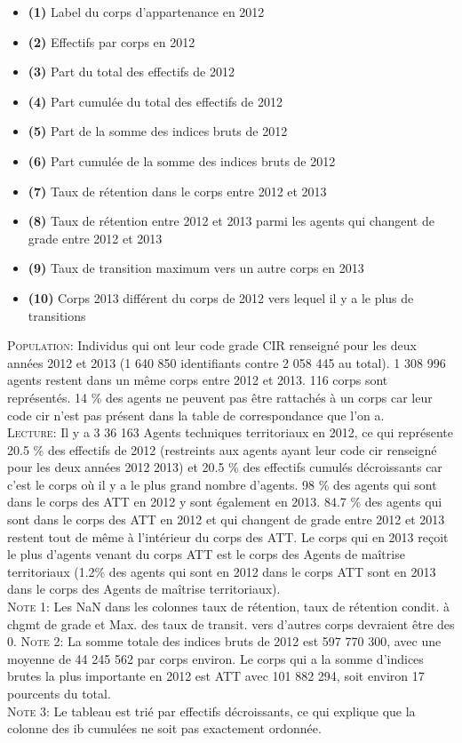 \documentclass[10pt]{article}
\begin{document}
\begin{landscape}
\begin{itemize}
	\item \textbf{(1)} Label du corps d'appartenance en 2012
	\item \textbf{(2)} Effectifs par corps en 2012
	\item \textbf{(3)} Part du total des effectifs de 2012
	\item \textbf{(4)} Part cumulée du total des effectifs de 2012
	\item \textbf{(5)} Part de la somme des indices bruts de 2012
	\item \textbf{(6)} Part cumulée de la somme des indices bruts de 2012
	\item \textbf{(7)} Taux de rétention dans le corps entre 2012 et 2013
	\item \textbf{(8)} Taux de rétention entre 2012 et 2013 parmi les agents qui changent de grade entre 2012 et 2013 
	\item \textbf{(9)} Taux de transition maximum vers un autre corps en 2013
	\item \textbf{(10)} Corps 2013 différent du corps de 2012 vers lequel il y a le plus de transitions
\end{itemize}
\indent \indent \textsc{Population:} Individus qui ont leur code grade CIR renseigné pour les deux années 2012 et 2013 (1 640 850 identifiants contre 2 058 445 au total). 1 308 996 agents restent dans un même corps entre 2012 et 2013. 116 corps sont représentés. 14 \% des agents ne peuvent pas être rattachés à un corps car leur code cir n'est pas présent dans la table de correspondance que l'on a.\\
\indent \textsc{Lecture:} Il y a 3 36 163 Agents techniques territoriaux en 2012, ce qui représente 20.5 \% des effectifs de 2012 (restreints aux agents ayant leur code cir renseigné pour les deux années 2012 2013) et 20.5 \% des effectifs cumulés décroissants car c'est le corps où il y a le plus grand nombre d'agents. 98 \% des agents qui sont dans le corps des ATT en 2012 y sont également en 2013. 84.7 \% des agents qui sont dans le corps des ATT en 2012 et qui changent de grade entre 2012 et 2013 restent tout de même à l'intérieur du corps des ATT. Le corps qui en 2013 reçoit le plus d'agents venant du corps ATT est le corps des Agents de maîtrise territoriaux (1.2\% des agents qui sont en 2012 dans le corps ATT sont en 2013 dans le corps des Agents de maîtrise territoriaux).\\
\indent \textsc{Note 1:} Les NaN dans les colonnes taux de rétention, taux de rétention condit. à chgmt de grade et Max. des taux de transit. vers d'autres corps devraient être des 0.
\indent \textsc{Note 2:} La somme totale des indices bruts de 2012 est 597 770 300, avec une moyenne de 44 245 562 par corps environ. Le corps qui a la somme d'indices brutes la plus importante en 2012 est ATT avec 101 882 294, soit environ 17 pourcents du total.\\
\indent \textsc{Note 3:} Le tableau est trié par effectifs décroissants, ce qui explique que la colonne des ib cumulées ne soit pas exactement ordonnée.\\



\end{landscape}
\end{document}
